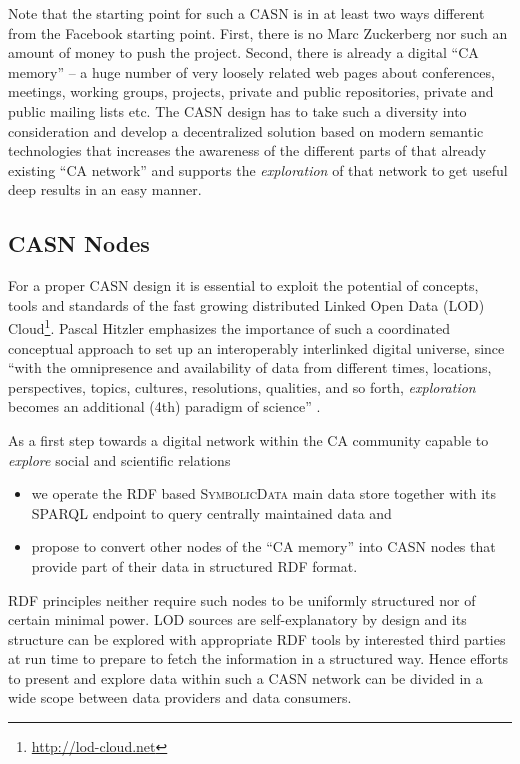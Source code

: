 \documentclass[a4paper,11pt]{article}
\def\SD{\textsc{SymbolicData}}
\begin{document}
Note that the starting point for such a CASN is in at least two ways different
from the Facebook starting point. First, there is no Marc Zuckerberg nor such
an amount of money to push the project. Second, there is already a digital ``CA
memory'' -- a huge number of very loosely related web pages about conferences,
meetings, working groups, projects, private and public repositories, private
and public mailing lists etc. The CASN design has to take such a diversity into
consideration and develop a decentralized solution based on modern semantic
technologies that increases the awareness of the different parts of that
already existing ``CA network'' and supports the \emph{exploration} of that
network to get useful deep results in an easy manner.

\subsection{CASN Nodes}

For a proper CASN design it is essential to exploit the potential of concepts,
tools and standards of the fast growing distributed Linked Open Data (LOD)
Cloud\footnote{ \url{http://lod-cloud.net}}.  Pascal Hitzler emphasizes the
importance of such a coordinated conceptual approach to set up an interoperably
interlinked digital universe, since ``with the omnipresence and availability of
data from different times, locations, perspectives, topics, cultures,
resolutions, qualities, and so forth, \emph{exploration} becomes an additional
(4th) paradigm of science'' \cite{hitzler-13}.

As a first step towards a digital network within the CA community capable
to \emph{explore} social and scientific relations
\begin{itemize}
\item we operate the RDF based {\SD} main data store together with its SPARQL
  endpoint \cite{sdsparql} to query centrally maintained data and
\item propose to convert other nodes of the ``CA memory'' into CASN nodes that
  provide part of their data in structured RDF format.
\end{itemize}
RDF principles neither require such nodes to be uniformly structured nor of
certain minimal power. LOD sources are self-explanatory by design and its
structure can be explored with appropriate RDF tools by interested third
parties at run time to prepare to fetch the information in a structured way.
Hence efforts to present and explore data within such a CASN network can be
divided in a wide scope between data providers and data consumers. 
\end{document}
